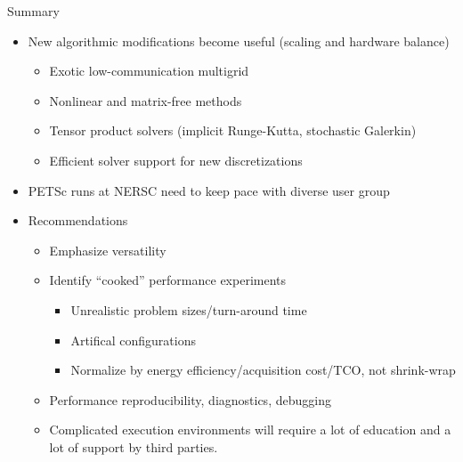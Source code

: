 \documentclass{beamer}
\begin{document}
\begin{frame}{Summary}
  \begin{itemize}
  \item New algorithmic modifications become useful (scaling and hardware balance)
    \begin{itemize}
    \item Exotic low-communication multigrid
    \item Nonlinear and matrix-free methods
    \item Tensor product solvers (implicit Runge-Kutta, stochastic Galerkin)
    \item Efficient solver support for new discretizations
    \end{itemize}
  \item PETSc runs at NERSC need to keep pace with diverse user group
  \item Recommendations
    \begin{itemize}
    \item Emphasize versatility
    \item Identify ``cooked'' performance experiments
      \begin{itemize}
      \item Unrealistic problem sizes/turn-around time
      \item Artifical configurations
      \item Normalize by energy efficiency/acquisition cost/TCO, not shrink-wrap
      \end{itemize}
    \item Performance reproducibility, diagnostics, debugging
    \item Complicated execution environments will require a lot of
      education and a lot of support by third parties.
    \end{itemize}
  \end{itemize}
\end{frame}
\end{document}

